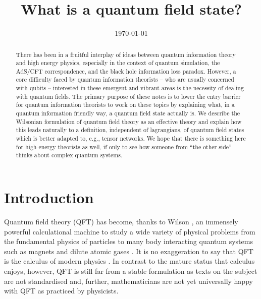 \documentclass[11pt]{amsart}
\title{What is a quantum field state?}
\date{\today}                                           %
\theoremstyle{plain}%
\theoremstyle{definition}
\theoremstyle{remark}
\begin{document}
\begin{abstract} 
There has been in a fruitful interplay of ideas between quantum information theory and high energy physics, especially in the context of quantum simulation, the AdS/CFT correspondence, and the black hole information loss paradox. However, a core difficulty faced by quantum information theorists -- who are usually concerned with qubits -- interested in these emergent and vibrant areas is the necessity of dealing with quantum fields. The primary purpose of these notes is to lower the entry barrier for quantum information theorists to work on these topics by explaining what, in a quantum information friendly way, a quantum field state actually is. We describe the Wilsonian formulation of quantum field theory as an effective theory and explain how this leads naturally to a definition, independent of lagrangians, of quantum field states which is better adapted to, e.g., tensor networks. We hope that there is something here for high-energy theorists as well, if only to see how someone from ``the other side'' thinks about complex quantum systems.
\end{abstract}

\maketitle

\section{Introduction}
Quantum field theory (QFT) has become, thanks to Wilson 
\cite{wilson_renormalization_1974,wilson_renormalization_1975}, an immensely powerful calculational machine to study a wide variety of physical problems from the fundamental physics of particles \cite{peskin_introduction_1995,weinberg_quantum_1996,weinberg_quantum_1996-1,weinberg_quantum_2000} to many body interacting quantum systems such as magnets and dilute atomic gases \cite{fradkin_field_2013}. It is no exaggeration to say that QFT is the calculus of modern physics \cite{witten_surface_2006,seiberg_nathan_2014}. In contrast to the mature status that calculus enjoys, however, QFT is still far from a stable formulation \cite{howard_georgi_particles_2012,moore_physical_2014,seiberg_nathan_2014} as texts on the subject are not standardised and, further,  mathematicians are not yet universally happy with QFT as practiced by physicists. 
\end{document}
